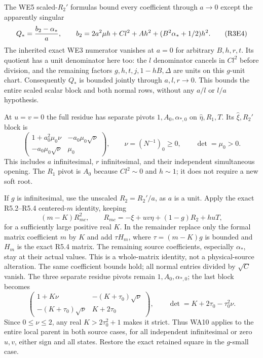 The WE5 scaled-$R_2'$ formulas bound every coefficient through
$a\to0$ except the apparently singular
\[
 Q_*={b_2-\alpha_*\over a},\qquad
 b_2=2a^2\mu h+Cl^2+Ah^2+(B^2\alpha_*+1/2)h^2.  \tag{R3E4}
\]
The inherited exact WE3 numerator vanishes at $a=0$ for arbitrary
$B,h,r,t$. Its quotient has a unit denominator here too: the $l$
denominator cancels in $Cl^2$ before division, and the remaining
factors $g,h,t,j,1-hB,\Delta$ are units on this $g$-unit chart.
Consequently $Q_*$ is bounded jointly through $a,l,r\to0$.
This bounds the entire scaled scalar block and both normal rows,
without any $a/l$ or $l/a$ hypothesis.

At $u=v=0$ the full residue has separate pivots $1,A_0,\alpha_{*,0}$
on $\widehat\eta,R_1,T$. Its $\widehat\xi,R_2'$ block is
\[
 \begin{pmatrix}
 1+a_0^2\mu_0\nu&-a_0\mu_0\sqrt\nu\\
 -a_0\mu_0\sqrt\nu&\mu_0
 \end{pmatrix},\qquad
 \nu=(N^{-1})_0\ge0,\qquad \det=\mu_0>0.          \tag{R3E5}
\]
This includes $a$ infinitesimal, $r$ infinitesimal, and their
independent simultaneous opening. The $R_1$ pivot is $A_0$ because
$Cl^2\sim0$ and $h\sim1$; it does not require a new soft root.

If $g$ is infinitesimal, use the unscaled $R_2=R_2'/a$, as $a$
is a unit. Apply the exact R5.2--R5.4 centered-$m$ identity, keeping
\[
 (m-K)R_{mc}^2,\qquad
 R_{mc}=-\xi+uv\eta+(1-g)R_2+huT,
\]
for a sufficiently large positive real $K$. In the remainder
replace only the formal matrix coefficient $m$ by $K$ and add
$\tau H_m$, where $\tau=(m-K)g$ is bounded and $H_m$ is the exact
R5.4 matrix. The remaining source coefficients, especially
$\alpha_*$, stay at their actual values. This is a whole-matrix
identity, not a physical-source alteration. The same coefficient
bounds hold; all normal entries divided by $\sqrt C$ vanish.
The three separate residue pivots remain $1,A_0,\alpha_{*,0}$;
the last block becomes
\[
 \begin{pmatrix}
 1+K\nu&-(K+\tau_0)\sqrt\nu\\
 -(K+\tau_0)\sqrt\nu&K+2\tau_0
 \end{pmatrix},\qquad
 \det=K+2\tau_0-\tau_0^2\nu.                       \tag{R3E6}
\]
Since $0\le\nu\le2$, any real $K>2\tau_0^2+1$ makes it strict.
Thus WA10 applies to the entire local parent in both source cases,
for all independent infinitesimal or zero $u,v$, either sign and
all states. Restore the exact retained square in the $g$-small case.

